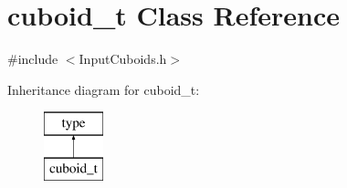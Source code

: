 \hypertarget{classcuboid__t}{\section{cuboid\-\_\-t Class Reference}
\label{classcuboid__t}
}


{\ttfamily \#include $<$Input\-Cuboids.\-h$>$}

Inheritance diagram for cuboid\-\_\-t\-:\begin{figure}[H]
\begin{center}
\leavevmode
\includegraphics[height=2.000000cm]{classcuboid__t}
\end{center}
\end{figure}
